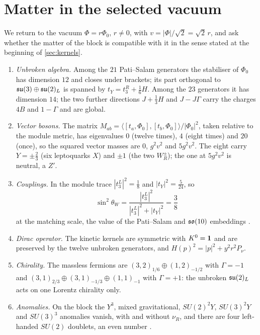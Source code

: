 \section{Matter in the selected vacuum}
\label{sec:matter}

We return to the vacuum $\Phi=r\Phi_0$, $r\neq0$, with $v=|\Phi|/\sqrt2=\sqrt2\,r$, and ask whether the matter of the block is compatible with
it in the sense stated at the beginning of \cref{sec:kernels}.

\begin{theorem}
\label{thm:compat}
\begin{enumerate}[label=(\alph*),leftmargin=2.2em]
\item \emph{Unbroken algebra.} Among the $21$ Pati--Salam generators the stabiliser of $\Phi_0$ has dimension $12$ and closes under brackets; its part
orthogonal to $\mathfrak{su}(3)\oplus\mathfrak{su}(2)_L$ is spanned by $t_Y=t^R_3+\tfrac16H$. Among the $23$ generators it has dimension $14$; the two further directions $J+\tfrac13H$
and $J-J\Gamma$ carry the charges $4B$ and $1-\Gamma$ and are global.
\item \emph{Vector bosons.} The matrix $M_{ab}=\langle[t_a,\Phi_0],[t_b,\Phi_0]\rangle/|\Phi_0|^2$, taken relative to the module metric, has eigenvalues $0$ (twelve
times), $4$ (eight times) and $20$ (once), so the squared vector masses are $0$, $g^2v^2$ and $5g^2v^2$. The eight carry $Y=\pm\tfrac23$ (six leptoquarks
$X$) and $\pm1$ (the two $W_R^\pm$); the one at $5g^2v^2$ is neutral, a $Z'$.
\item \emph{Couplings.} In the module trace $|t^L_3|^2=\tfrac18$ and $|t_Y|^2=\tfrac5{24}$, so
\[
\sin^2\theta_W=\frac{|t^L_3|^2}{|t^L_3|^2+|t_Y|^2}=\frac38
\]
at the matching scale, the value of the Pati--Salam and $\mathfrak{so}(10)$ embeddings \cite{GeorgiQuinnWeinberg74}.
\item \emph{Dirac operator.} The kinetic kernels are symmetric with $K^0=\mathbf 1$ and are preserved by the twelve unbroken generators, and $H(p)^2=|p|^2+y^2r^2P_\nu$.
\item \emph{Chirality.} The massless fermions are $(3,2)_{1/6}\oplus(1,2)_{-1/2}$ with $\Gamma=-1$ and $(3,1)_{2/3}\oplus(3,1)_{-1/3}\oplus(1,1)_{-1}$ with $\Gamma=+1$:
the unbroken $\mathfrak{su}(2)_L$ acts on one Lorentz chirality only.
\item \emph{Anomalies.} On the block the $Y^3$, mixed gravitational, $SU(2)^2Y$, $SU(3)^2Y$ and $SU(3)^3$ anomalies vanish, with and without $\nu_R$, and there are
four left-handed $SU(2)$ doublets, an even number \cite{Witten82}.
\end{enumerate}
\end{theorem}

